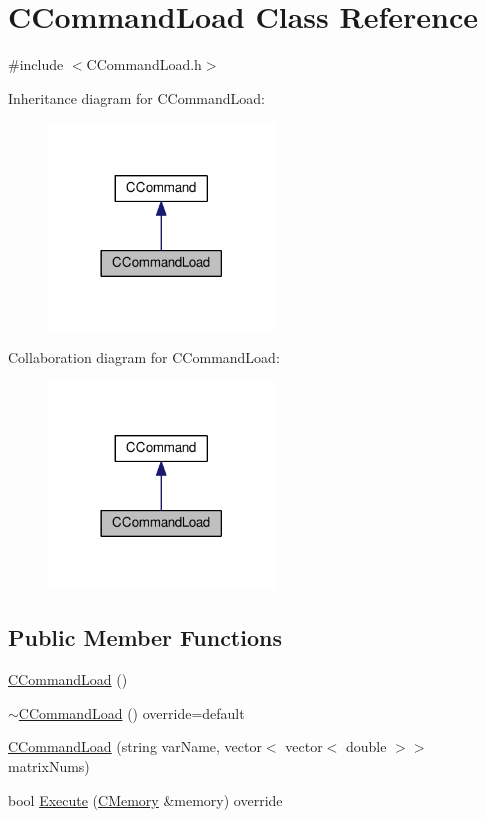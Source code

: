 \hypertarget{classCCommandLoad}{}\section{C\+Command\+Load Class Reference}
\label{classCCommandLoad}


{\ttfamily \#include $<$C\+Command\+Load.\+h$>$}



Inheritance diagram for C\+Command\+Load\+:\nopagebreak
\begin{figure}[H]
\begin{center}
\leavevmode
\includegraphics[width=170pt]{classCCommandLoad__inherit__graph}
\end{center}
\end{figure}


Collaboration diagram for C\+Command\+Load\+:\nopagebreak
\begin{figure}[H]
\begin{center}
\leavevmode
\includegraphics[width=170pt]{classCCommandLoad__coll__graph}
\end{center}
\end{figure}
\subsection*{Public Member Functions}
\begin{DoxyCompactItemize}
\item 
\hyperlink{classCCommandLoad_a88702ae3cce0d9197c6a58d2726952f9}{C\+Command\+Load} ()
\item 
\hyperlink{classCCommandLoad_a6430e6c5bb123b4a22a153b705655b6c}{$\sim$\+C\+Command\+Load} () override=default
\item 
\hyperlink{classCCommandLoad_aa53bda871a5d4d8af9fbdbc0e4d0ffe3}{C\+Command\+Load} (string var\+Name, vector$<$ vector$<$ double $>$$>$ matrix\+Nums)
\item 
bool \hyperlink{classCCommandLoad_a5940ee064de6b5497e9b868b1add9880}{Execute} (\hyperlink{classCMemory}{C\+Memory} \&memory) override
\end{DoxyCompactItemize}
